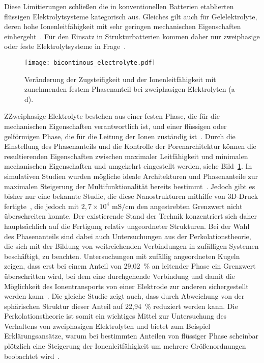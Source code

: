 Diese Limitierungen schließen die in konventionellen Batterien etablierten flüssigen Elektrolytsysteme kategorisch aus. Gleiches gilt auch für Gelelektrolyte, deren hohe Ionenleitfähigkeit mit sehr geringen mechanischen Eigenschaften einhergeht~\cite{Gayet2009, Li2018, Zhao2020a}. Für den Einsatz in Strukturbatterien kommen daher nur zweiphasige oder feste Elektrolytsysteme in Frage~\cite{Greenhalgh2023}.

\begin{figure}[h]
        \center
	\texttt{[image: bicontinous\_electrolyte.pdf]}
		\caption{\label{fig:bicontinous_electrolyte}Veränderung der Zugsteifigkeit und der Ionenleitfähigkeit mit zunehmenden festem Phasenanteil bei zweiphasigen Elektrolyten (a-d).}
\end{figure}
ZZweiphasige Elektrolyte bestehen aus einer festen Phase, die für die mechanischen Eigenschaften verantwortlich ist, und einer flüssigen oder gelförmigen Phase, die für die Leitung der Ionen zuständig ist~\cite{Ichino1995}. Durch die Einstellung des Phasenanteils und die Kontrolle der Porenarchitektur können die resultierenden Eigenschaften zwischen maximaler Leitfähigkeit und minimalen mechanischen Eigenschaften und umgekehrt eingestellt werden, siehe Bild~\ref{fig:bicontinous_electrolyte}. In simulativen Studien wurden mögliche ideale Architekturen und Phasenanteile zur maximalen Steigerung der Multifunktionalität bereits bestimmt~\cite{Lee2019,Tu2020}. Jedoch gibt es bisher nur eine bekannte Studie, die diese Nanostrukturen mithilfe von 3D-Druck fertigte~\cite{Zekoll2018}, die jedoch mit $2,7 \times 10^4$ $\si{\milli \siemens \per \cm}$ den angestrebten Grenzwert nicht überschreiten konnte. Der existierende Stand der Technik konzentriert sich daher hauptsächlich auf die Fertigung relativ ungeordneter Strukturen. Bei der Wahl des Phasenanteils sind dabei auch Untersuchungen aus der Perkolationstheorie, die sich mit der Bildung von weitreichenden Verbindungen in zufälligen Systemen beschäftigt, zu beachten. Untersuchungen mit zufällig angeordneten Kugeln zeigen, dass erst bei einem Anteil von 29,02~\% an leitender Phase ein Grenzwert überschritten wird, bei dem eine durchgehende Verbindung und damit die Möglichkeit des Ionentransports von einer Elektrode zur anderen sichergestellt werden kann~\cite{Li2020b}. Die gleiche Studie zeigt auch, dass durch Abweichung von der sphärischen Struktur dieser Anteil auf 22,94~\% reduziert werden kann. Die Perkolationstheorie ist somit ein wichtiges Mittel zur Untersuchung des Verhaltens von zweiphasigen Elektrolyten und bietet zum Beispiel Erklärungsansätze, warum bei bestimmten Anteilen von flüssiger Phase scheinbar plötzlich eine Steigerung der Ionenleitfähigkeit um mehrere Größenordnungen beobachtet wird~\cite{Melodia2023}.

